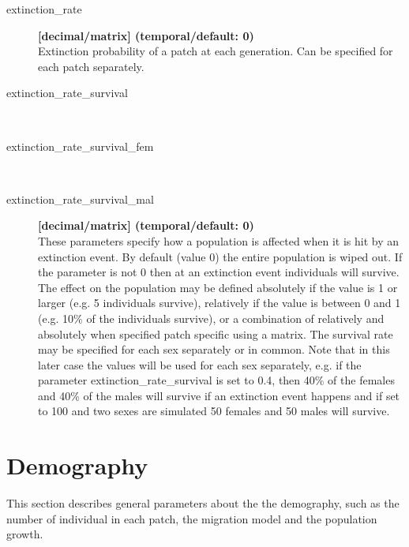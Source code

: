 \documentclass[letterpaper,12pt,oneside]{book}
\begin{document}
\begin{description}
\item[extinction\_rate] \textbf{[decimal/matrix] (temporal/default: 0)}\\
Extinction probability of a patch at each generation. Can be specified for each patch separately.

\item[extinction\_rate\_survival]\hspace*{\fill}\\
\vspace{-9mm}
\item[extinction\_rate\_survival\_fem]\hspace*{\fill}\\
\vspace{-9mm}
\item[extinction\_rate\_survival\_mal] \textbf{[decimal/matrix] (temporal/default: 0)}\\
These parameters specify how a population is affected when it is hit by an extinction event. By default (value 0) the entire population is wiped out. If the parameter is not 0 then at an extinction event individuals will survive. The effect on the population may be defined absolutely if the value is 1 or larger (e.g. 5 individuals survive), relatively if the value is between 0 and 1 (e.g. 10\% of the individuals survive), or a combination of relatively and absolutely when specified patch specific  using a matrix. The survival rate may be specified for each sex separately or in common. Note that in this later case the values will be used for each sex separately, e.g. if the parameter \textsf{extinction\_rate\_survival} is set to 0.4, then 40\% of the females and 40\% of the males will survive if an extinction event happens and if set to 100 and two sexes are simulated 50 females and 50 males will survive.

\end{description}


\newpage
\chapter{Demography}\label{chap:Demography}
This section describes general parameters about the the demography, such as the number of individual in each patch, the migration model and the population growth. 
\end{document}
